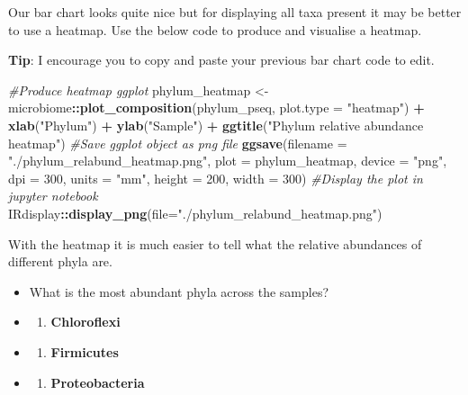 \documentclass[
]{book}
\newenvironment{Shaded}{\begin{snugshade}}{\end{snugshade}}
\newcommand{\AttributeTok}[1]{\textcolor[rgb]{0.13,0.29,0.53}{#1}}
\newcommand{\CommentTok}[1]{\textcolor[rgb]{0.56,0.35,0.01}{\textit{#1}}}
\newcommand{\DecValTok}[1]{\textcolor[rgb]{0.00,0.00,0.81}{#1}}
\newcommand{\FunctionTok}[1]{\textcolor[rgb]{0.13,0.29,0.53}{\textbf{#1}}}
\newcommand{\NormalTok}[1]{#1}
\newcommand{\OtherTok}[1]{\textcolor[rgb]{0.56,0.35,0.01}{#1}}
\newcommand{\SpecialCharTok}[1]{\textcolor[rgb]{0.81,0.36,0.00}{\textbf{#1}}}
\newcommand{\StringTok}[1]{\textcolor[rgb]{0.31,0.60,0.02}{#1}}
\providecommand{\tightlist}{%
  \setlength{\itemsep}{0pt}\setlength{\parskip}{0pt}}
\begin{document}
Our bar chart looks quite nice but for displaying all taxa present it may be better to use a heatmap.
Use the below code to produce and visualise a heatmap.

\textbf{Tip}: I encourage you to copy and paste your previous bar chart code to edit.

\begin{Shaded}
\begin{Highlighting}[]
\CommentTok{\#Produce heatmap ggplot}
\NormalTok{phylum\_heatmap }\OtherTok{\textless{}{-}}\NormalTok{ microbiome}\SpecialCharTok{::}\FunctionTok{plot\_composition}\NormalTok{(phylum\_pseq, }\AttributeTok{plot.type =} \StringTok{"heatmap"}\NormalTok{) }\SpecialCharTok{+}
  \FunctionTok{xlab}\NormalTok{(}\StringTok{"Phylum"}\NormalTok{) }\SpecialCharTok{+} \FunctionTok{ylab}\NormalTok{(}\StringTok{"Sample"}\NormalTok{) }\SpecialCharTok{+}
  \FunctionTok{ggtitle}\NormalTok{(}\StringTok{"Phylum relative abundance heatmap"}\NormalTok{)}
\CommentTok{\#Save ggplot object as png file}
\FunctionTok{ggsave}\NormalTok{(}\AttributeTok{filename =} \StringTok{"./phylum\_relabund\_heatmap.png"}\NormalTok{, }\AttributeTok{plot =}\NormalTok{ phylum\_heatmap,}
       \AttributeTok{device =} \StringTok{"png"}\NormalTok{, }\AttributeTok{dpi =} \DecValTok{300}\NormalTok{, }\AttributeTok{units =} \StringTok{"mm"}\NormalTok{, }\AttributeTok{height =} \DecValTok{200}\NormalTok{, }\AttributeTok{width =} \DecValTok{300}\NormalTok{)}
\CommentTok{\#Display the plot in jupyter notebook}
\NormalTok{IRdisplay}\SpecialCharTok{::}\FunctionTok{display\_png}\NormalTok{(}\AttributeTok{file=}\StringTok{"./phylum\_relabund\_heatmap.png"}\NormalTok{)}
\end{Highlighting}
\end{Shaded}

With the heatmap it is much easier to tell what the relative abundances of different phyla are.

\begin{itemize}
\item
  What is the most abundant phyla across the samples?
\item
  \begin{enumerate}
  \def\labelenumi{(\Alph{enumi})}
  \tightlist
  \item
    \textbf{Chloroflexi}\\
  \end{enumerate}
\item
  \begin{enumerate}
  \def\labelenumi{(\Alph{enumi})}
  \setcounter{enumi}{1}
  \tightlist
  \item
    \textbf{Firmicutes}\\
  \end{enumerate}
\item
  \begin{enumerate}
  \def\labelenumi{(\Alph{enumi})}
  \setcounter{enumi}{2}
  \tightlist
  \item
    \textbf{Proteobacteria}
  \end{enumerate}
\end{itemize}
\end{document}
